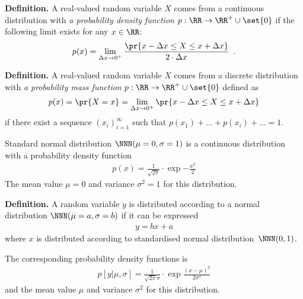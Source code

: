 \documentclass[landscape,footrule]{foils}
\begin{document}
\titlefoil




\textbf{Definition.}
A real-valued random variable $X$ comes from a continuous distribution with \emph{a probability density function} $p:\RR\to\RR^+\cup\set{0}$ if the following limit exists for any $x\in\RR$:
\begin{align*}
p(x)=\lim_{\Delta x \to 0^+} \frac{\pr{x -\Delta x \leq X\leq x+\Delta x}}{2\cdot \Delta x}\enspace.
\end{align*} 




\textbf{Definition.}
A real-valued random variable $X$ comes from a discrete distribution with \emph{a probability mass function} $p:\RR\to\RR^+\cup\set{0}$ defined as 
\begin{align*}
p(x)=\pr{X=x}=\lim_{\Delta x \to 0^+} \pr{x-\Delta x \leq X\leq x+\Delta x}
\end{align*}  
if there exist a sequence $(x_i)_{i=1}^\infty$ such that $p(x_1)+\ldots+p(x_i)+\ldots =1$.




Standard normal distribution $\NNN(\mu=0,\sigma=1)$ is a continuous distribution with a probability density function 
\begin{align*}
p(x)=\frac{1}{\sqrt{2\pi}}\cdot\exp{-\frac{x^2}{2}}
\end{align*}
The mean value $\mu=0$ and variance $\sigma^2=1$ for this distribution.



\textbf{Definition.}
A random variable $y$ is distributed according to a normal distribution $\NNN(\mu=a,\sigma=b)$ if it can be expressed 
\begin{align*}
y=bx+a
\end{align*}
where $x$ is distributed according to standardised normal distribution~$\NNN(0,1)$. \vspace*{1cm}

The corresponding probability density functions is
\begin{align*}
p[y|\mu,\sigma]=\frac{1}{\sqrt{2\pi}\sigma}\cdot\exp{\frac{(x-\mu)^2}{2\sigma^2}}
\end{align*}
and the mean value $\mu$ and variance $\sigma^2$ for this distribution.
\end{document}
